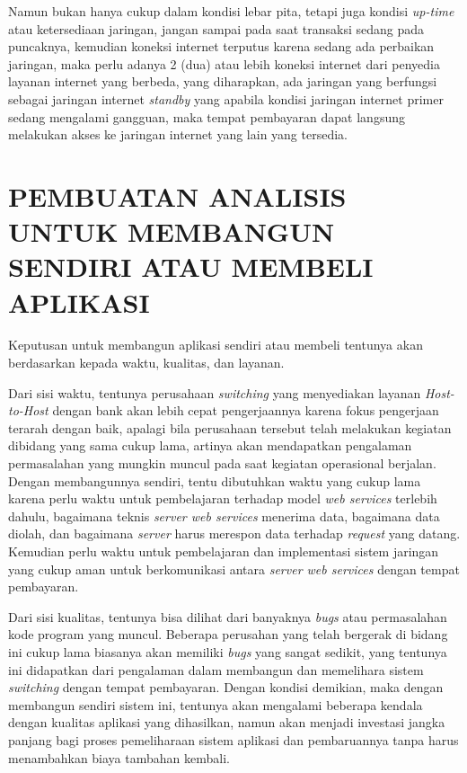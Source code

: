 \documentclass[pdftex, 12pt, oneside]{article}
\begin{document}
\begin{itemize}
  Namun bukan hanya cukup dalam kondisi lebar pita, tetapi juga kondisi \textit{up-time} atau ketersediaan jaringan, jangan sampai pada saat transaksi sedang pada puncaknya, kemudian koneksi internet terputus karena sedang ada perbaikan jaringan, maka perlu adanya 2 (dua) atau lebih koneksi internet dari penyedia layanan internet yang berbeda, yang diharapkan, ada jaringan yang berfungsi sebagai jaringan internet \textit{standby} yang apabila kondisi jaringan internet primer sedang mengalami gangguan, maka tempat pembayaran dapat langsung melakukan akses ke jaringan internet yang lain yang tersedia.
\end{itemize}


\section{PEMBUATAN ANALISIS UNTUK MEMBANGUN SENDIRI ATAU MEMBELI APLIKASI}

Keputusan untuk membangun aplikasi sendiri atau membeli tentunya akan berdasarkan kepada waktu, kualitas, dan layanan.

Dari sisi waktu, tentunya perusahaan \textit{switching} yang menyediakan layanan \textit{Host-to-Host} dengan bank akan lebih cepat pengerjaannya karena fokus pengerjaan terarah dengan baik, apalagi bila perusahaan tersebut telah melakukan kegiatan dibidang yang sama cukup lama, artinya akan mendapatkan pengalaman permasalahan yang mungkin muncul pada saat kegiatan operasional berjalan. Dengan membangunnya sendiri, tentu dibutuhkan waktu yang cukup lama karena perlu waktu untuk pembelajaran terhadap model \textit{web services} terlebih dahulu, bagaimana teknis \textit{server web services} menerima data, bagaimana data diolah, dan bagaimana \textit{server} harus merespon data terhadap \textit{request} yang datang. Kemudian perlu waktu untuk pembelajaran dan implementasi sistem jaringan yang cukup aman untuk berkomunikasi antara \textit{server web services} dengan tempat pembayaran.

Dari sisi kualitas, tentunya bisa dilihat dari banyaknya \textit{bugs} atau permasalahan kode program yang muncul. Beberapa perusahan yang telah bergerak di bidang ini cukup lama biasanya akan memiliki \textit{bugs} yang sangat sedikit, yang tentunya ini didapatkan dari pengalaman dalam membangun dan memelihara sistem \textit{switching} dengan tempat pembayaran. Dengan kondisi demikian, maka dengan membangun sendiri sistem ini, tentunya akan mengalami beberapa kendala dengan kualitas aplikasi yang dihasilkan, namun akan menjadi investasi jangka panjang bagi proses pemeliharaan sistem aplikasi dan pembaruannya tanpa harus menambahkan biaya tambahan kembali.
\end{document}
